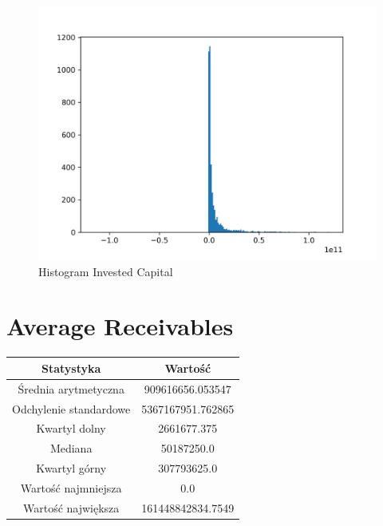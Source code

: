 \documentclass{article}
\begin{document}
\begin{figure}[h!]
    \includegraphics[width=\linewidth]{variables/Invested Capital.png}
    \caption{Histogram Invested Capital }
\end{figure}\section{ Average Receivables }

\begin{center}
    \begin{tabular}{|c | c|} 
    \hline
    Statystyka & Wartość \\
    \hline\hline
    Średnia arytmetyczna & 909616656.053547 \\ 
    \hline
    Odchylenie standardowe & 5367167951.762865 \\
    \hline
    Kwartyl dolny & 2661677.375 \\
    \hline
    Mediana & 50187250.0 \\
    \hline
    Kwartyl górny & 307793625.0 \\
    \hline
    Wartość najmniejsza & 0.0 \\
    \hline
    Wartość największa & 161448842834.7549 \\
    \hline
   \end{tabular}
\end{center}
\end{document}
